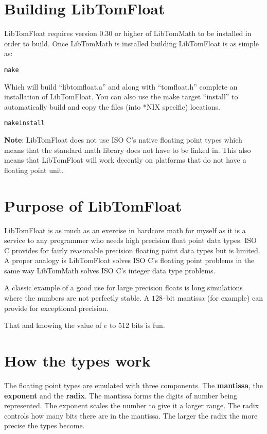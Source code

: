 \documentclass[b5paper]{book}
\begin{document}
\section{Building LibTomFloat}
LibTomFloat requires version 0.30 or higher of LibTomMath to be installed in order to build.  Once LibTomMath is installed building LibTomFloat
is as simple as:

\begin{alltt}
make
\end{alltt}

Which will build ``libtomfloat.a'' and along with ``tomfloat.h'' complete an installation of LibTomFloat.  You can also use the make target
``install'' to automatically build and copy the files (into *NIX specific) locations.  

\begin{alltt}
make install
\end{alltt}

\textbf{Note}: LibTomFloat does not use ISO C's native floating point types which means that the standard math library does not have to be
linked in.  This also means that LibTomFloat will work decently on platforms that do not have a floating point unit.


\section{Purpose of LibTomFloat}
LibTomFloat is as much as an exercise in hardcore math for myself as it is a service to any programmer who needs high precision float point
data types.  ISO C provides for fairly reasonable precision floating point data types but is limited.  A proper analogy is LibTomFloat solves
ISO C's floating point problems in the same way LibTomMath solves ISO C's integer data type problems.

A classic example of a good use for large precision floats is long simulations where the numbers are not perfectly stable.  A $128$--bit mantissa
(for example) can provide for exceptional precision.

That and knowing the value of $e$ to 512 bits is fun.

\section{How the types work}

 
The floating point types are emulated with three components.  The \textbf{mantissa}, the \textbf{exponent} and the \textbf{radix}.
The mantissa forms the digits of number being represented.  The exponent scales the number to give it a larger range.  The radix controls
how many bits there are in the mantissa.  The larger the radix the more precise the types become.  
\end{document}
